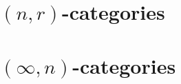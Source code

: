         \begin{appendices}
            \chapter{\texorpdfstring{$(n, r)$}{}-categories}
                \begin{abstract}
                    
                \end{abstract}
                
                \minitoc
                
                
                
                
                
            \chapter{\texorpdfstring{$(\infty, n)$}{}-categories}
                \begin{abstract}
                    
                \end{abstract}
                
                \minitoc
                
                
                
                

        \end{appendices}
	
	\printbibliography

